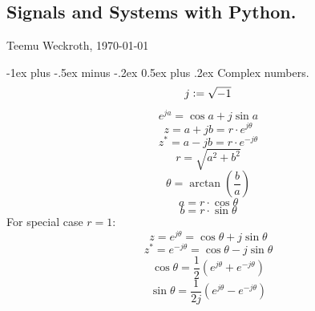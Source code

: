 \documentclass[10pt,landscape]{article}
\makeatletter
\renewcommand{\section}{\@startsection{section}{1}{0mm}%
	{-1ex plus -.5ex minus -.2ex}%
	{0.5ex plus .2ex}%
	{\normalfont\large\bfseries}}
\makeatother
\begin{document}
	
	\raggedright
	\footnotesize
	\begin{multicols}{3}
		
		
		\setlength{\premulticols}{1pt}
		\setlength{\postmulticols}{1pt}
		\setlength{\multicolsep}{1pt}
		\setlength{\columnsep}{2pt}
		
		\part*{Signals and Systems with Python.}
		\begin{center}
			Teemu Weckroth, \today
		\end{center}
		
		\section{Complex numbers.}
			\begin{equation*}
				j \vcentcolon = \sqrt{-1}
			\end{equation*}
			\begin{equation*}
				e^{j a} = \cos{a} + j \sin{a}
			\end{equation*}
			\begin{equation*}
				z = a + jb = r \cdot e^{j \theta}
			\end{equation*}
			\begin{equation*}
				z^* = a - j b = r \cdot e^{- j \theta}
			\end{equation*}
			\begin{equation*}
				r = \sqrt{a^2 + b^2}
			\end{equation*}
			\begin{equation*}
				\theta = \arctan\left( \frac{b}{a}\right)
			\end{equation*}
			\begin{equation*}
				a = r \cdot \cos{\theta}
			\end{equation*}
			\begin{equation*}
				b = r \cdot \sin{\theta}
			\end{equation*}
		For special case $r = 1$:
			\begin{equation*}
				z = e^{j \theta} = \cos{\theta} + j \sin{\theta}
			\end{equation*}
			\begin{equation*}
				z^{*} = e^{- j \theta} = \cos{\theta} - j \sin{\theta}
			\end{equation*}
			\begin{equation*}
				\cos{\theta} = \frac{1}{2} \left(e^{j \theta} + e^{- j \theta}\right)
			\end{equation*}
			\begin{equation*}
				\sin{\theta} = \frac{1}{2j} \left(e^{j \theta} - e^{- j \theta}\right)
			\end{equation*}
		

\end{multicols}
\end{document}
